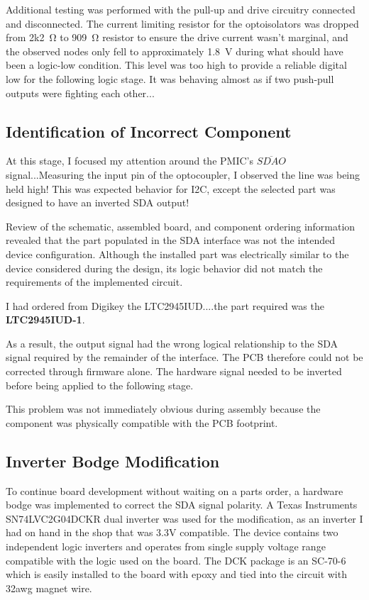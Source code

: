 Additional testing was performed with the pull-up and drive circuitry connected and
disconnected. The current limiting resistor for the optoisolators was dropped from 2k2\SI{}{\ohm} to \SI{909}{\ohm} resistor to ensure the drive current wasn't marginal, and the observed nodes only fell to approximately \SI{1.8}{\volt} during what should have
been a logic-low condition. This level was too high to provide a reliable digital
low for the following logic stage. It was behaving almost as if two push-pull outputs were fighting each other...

\subsection{Identification of Incorrect Component}
At this stage, I focused my attention around the PMIC's $\overline{SDAO}$ signal...Measuring the input pin of the optocoupler, I observed the line was being held high! This was expected behavior for I2C, except the selected part was designed to have an inverted SDA output!

Review of the schematic, assembled board, and component ordering information revealed
that the part populated in the SDA interface was not the intended device configuration.
Although the installed part was electrically similar to the device considered during
the design, its logic behavior did not match the requirements of the implemented
circuit.

I had ordered from Digikey the LTC2945IUD....the part required was the \textbf{LTC2945IUD-1}.

As a result, the output signal had the wrong logical relationship to the SDA signal
required by the remainder of the interface. The PCB therefore could not be corrected
through firmware alone. The hardware signal needed to be inverted before being
applied to the following stage.

This problem was not immediately obvious during assembly because the component was
physically compatible with the PCB footprint.

\subsection{Inverter Bodge Modification}

To continue board development without waiting on a parts order, a hardware
bodge was implemented to correct the SDA signal polarity. A Texas Instruments\\ SN74LVC2G04DCKR dual inverter was used for the modification, as an inverter I had on hand in the shop that was 3.3V compatible. The device contains two
independent logic inverters and operates from single supply voltage range compatible with
the logic used on the board. The DCK package is an SC-70-6 which is easily installed to the board with epoxy and tied into the circuit with 32awg magnet wire.

